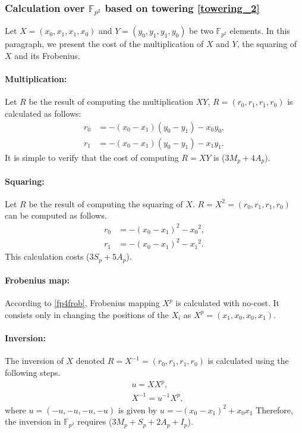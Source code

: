 \subsubsection{Calculation over $\mathbb{F}_{p^2}$ based on towering \eqref{towering_2}}
Let $X=(x_0,x_1,x_1,x_0)$ and $Y=(y_0,y_1,y_1,y_0)$ be  two $\mathbb{F}_{p^2}$ elements.  In this paragraph, we present the cost of the multiplication of $X$ and $Y$, the squaring of $X$ and its Frobenius.
\paragraph{\bf{Multiplication:} }
Let $R$ be the result of computing the multiplication $X Y$, $R=(r_0,r_1,r_1,r_0)$ is calculated as follows:
\begin{align}
r_0&= -(x_0-x_1)(y_0-y_1)-x_0y_0, \nonumber \\
r_1&=-(x_0-x_1)(y_0-y_1)-x_1y_1. \nonumber
\end{align}
It is simple to verify that the cost of computing $R=XY$ is ($3M_p+4A_p$).
\paragraph{\bf{Squaring:}}
Let $R$ be the result of computing the squaring of $X$. $R=X^2=(r_0,r_1,r_1,r_0)$ can be computed  as follows. 
\begin{align}
r_0&= -(x_0-x_1)^2-{x_0}^2, \nonumber \\
r_1&= -(x_0-x_1)^2-{x_1}^2. \nonumber
\end{align}
This calculation costs ($3S_p+5A_p$).
\paragraph{\bf{Frobenius map:}}
According to \eqref{fp4frob}, Frobenius mapping $X^{p}$ is calculated with no-cost. It consists only in changing the positions of the $X_i$ as $X^{p}=(x_1,x_0,x_0,x_1)$.
\paragraph{\bf{Inversion:}}
The inversion of $X$ denoted  $R=X^{-1}=(r_0,r_1,r_1,r_0)$ is calculated using the following steps.
\begin{eqnarray}
&u=XX^{p}, \nonumber \\
&X^{-1}=u^{-1}X^{p}, \nonumber
\end{eqnarray}
where $u=(-u,-u,-u,-u)$ is given by $u=-(x_0-x_1)^2+x_0x_1$
Therefore, the inversion in $\mathbb{F}_{p^2}$ requires  ($3M_p+S_p+2A_p+I_p$).

